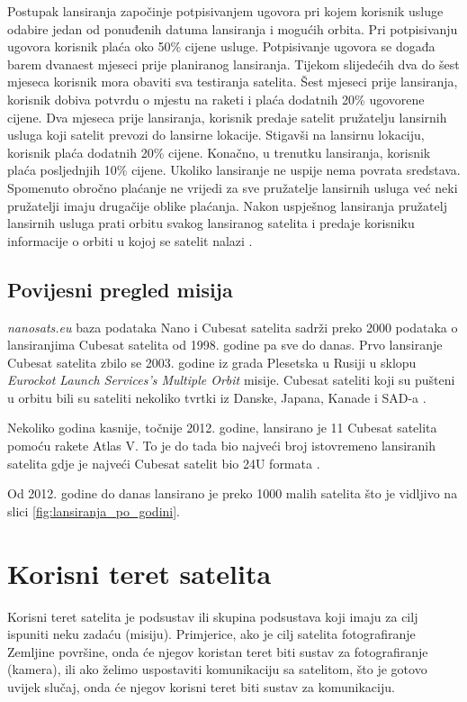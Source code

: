 \documentclass[times, utf8, diplomski, numeric]{templates/template}
\begin{document}
{{            Postupak lansiranja započinje potpisivanjem ugovora pri kojem korisnik usluge odabire jedan od ponuđenih datuma lansiranja i mogućih orbita. Pri potpisivanju ugovora korisnik plaća oko 50\% cijene usluge. Potpisivanje ugovora se događa barem dvanaest mjeseci prije planiranog lansiranja. Tijekom slijedećih dva do šest mjeseca korisnik mora obaviti sva testiranja satelita. Šest mjeseci prije lansiranja, korisnik dobiva potvrdu o mjestu na raketi i plaća dodatnih 20\% ugovorene cijene. Dva mjeseca prije lansiranja, korisnik predaje satelit pružatelju lansirnih usluga koji satelit prevozi do lansirne lokacije. Stigavši na lansirnu lokaciju, korisnik plaća dodatnih 20\% cijene. Konačno, u trenutku lansiranja, korisnik plaća posljednjih 10\% cijene. Ukoliko lansiranje ne uspije nema povrata sredstava. Spomenuto obročno plaćanje ne vrijedi za sve pružatelje lansirnih usluga već neki pružatelji imaju drugačije oblike plaćanja. Nakon uspješnog lansiranja pružatelj lansirnih usluga prati orbitu svakog lansiranog satelita i predaje korisniku informacije o orbiti u kojoj se satelit nalazi \cite{fersat}. 
        
        \subsection{Povijesni pregled misija}{
            \emph{nanosats.eu} baza podataka Nano i Cubesat satelita \cite{nanosats} sadrži preko 2000 podataka o lansiranjima Cubesat satelita od 1998. godine pa sve do danas. Prvo lansiranje Cubesat satelita zbilo se 2003. godine iz grada Plesetska u Rusiji u sklopu \emph{Eurockot Launch Services's Multiple Orbit} misije. Cubesat sateliti koji su pušteni u orbitu bili su sateliti nekoliko tvrtki iz Danske, Japana, Kanade i SAD-a \cite{prva_misija}.

            Nekoliko godina kasnije, točnije 2012. godine, lansirano je 11 Cubesat satelita pomoću rakete Atlas V. To je do tada bio najveći broj istovremeno lansiranih satelita gdje je najveći Cubesat satelit bio 24U formata \cite{najveci_lansirni_broj}.

            Od 2012. godine do danas lansirano je preko 1000 malih satelita što je vidljivo na slici \ref{fig:lansiranja_po_godini}.
        }
    }

    \section{Korisni teret satelita}{
        Korisni teret satelita  je podsustav ili skupina podsustava koji imaju za cilj ispuniti neku zadaću (misiju). Primjerice, ako je cilj satelita fotografiranje Zemljine površine, onda će njegov koristan teret biti sustav za fotografiranje (kamera), ili ako želimo uspostaviti komunikaciju sa satelitom, što je gotovo uvijek slučaj, onda će njegov korisni teret biti sustav za komunikaciju.

}}
\end{document}
